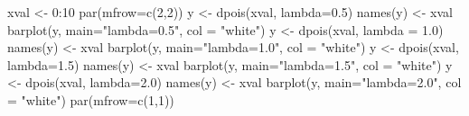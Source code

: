 \begin{Schunk}
\begin{Sinput}
 xval <- 0:10
 par(mfrow=c(2,2))
 y <- dpois(xval, lambda=0.5)
 names(y) <- xval
 barplot(y, main="lambda=0.5", col = "white")
 y <- dpois(xval, lambda = 1.0)
 names(y) <- xval
 barplot(y, main="lambda=1.0", col = "white")
 y <- dpois(xval, lambda=1.5)
 names(y) <- xval
 barplot(y, main="lambda=1.5", col = "white")
 y <- dpois(xval, lambda=2.0)
 names(y) <- xval
 barplot(y, main="lambda=2.0", col = "white")
 par(mfrow=c(1,1))
\end{Sinput}
\end{Schunk}
